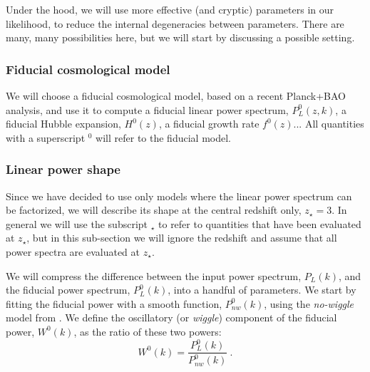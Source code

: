 Under the hood, we will use more effective (and cryptic) parameters in our 
likelihood, to reduce the internal degeneracies between parameters.
There are many, many possibilities here, but we will start by discussing a 
possible setting. 

\subsubsection{Fiducial cosmological model}
 
We will choose a fiducial cosmological model, based on a recent Planck+BAO 
analysis, and use it to compute a fiducial linear power spectrum, $P_L^0(z,k)$, 
a fiducial Hubble expansion, $H^0(z)$, a fiducial growth rate $f^0(z)$...
All quantities with a superscript $^0$ will refer to the fiducial model.

\subsubsection{Linear power shape}

Since we have decided to use only models where the linear power spectrum 
can be factorized, we will describe its shape at the central redshift only, 
$z_\star=3$. 
In general we will use the subscript $_\star$ to refer to quantities that 
have been evaluated at $z_\star$, but in this sub-section we will ignore 
the redshift and assume that all power spectra are evaluated at $z_\star$.

We will compress the difference between the input power spectrum, $P_L(k)$, 
and the fiducial power spectrum, $P^0_L(k)$, into a handful of parameters. 
We start by fitting the fiducial power with a smooth function, 
$P^0_{nw}(k)$, using the \textit{no-wiggle} model from \cite{Eisenstein1998}.
We define the oscillatory (or \textit{wiggle}) component of the 
fiducial power, $W^0(k)$, as the ratio of these two powers:
\begin{equation}
 W^0(k) = \frac{P^0_L(k)}{P^0_{nw}(k)} ~.
\end{equation} 

